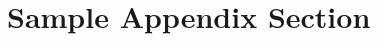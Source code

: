 \documentclass[10pt]{article}
\begin{document}
\appendix
\section{Sample Appendix Section}
\lipsum[1]






\end{document}
